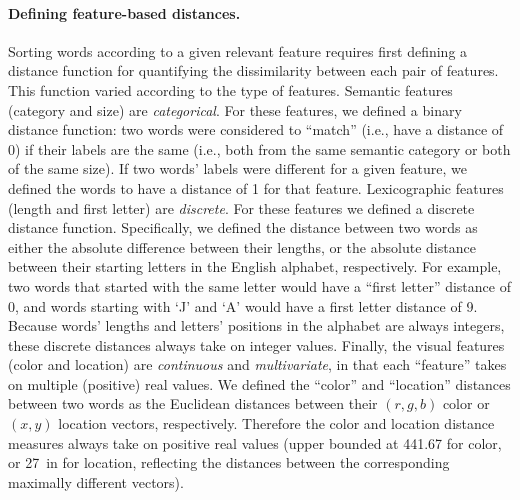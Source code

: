\documentclass[11pt]{article}
\begin{document}
\paragraph{Defining feature-based distances.} Sorting words according to a
given relevant feature requires first defining a distance function for
quantifying the dissimilarity between each pair of features. This function
varied according to the type of features. Semantic features (category and size)
are \textit{categorical}. For these features, we defined a binary distance
function: two words were considered to ``match'' (i.e., have a distance of 0)
if their labels are the same (i.e., both from the same semantic category or
both of the same size). If two words' labels were different for a given
feature, we defined the words to have a distance of 1 for that feature.
Lexicographic features (length and first letter) are \textit{discrete}. For
these features we defined a discrete distance function. Specifically, we
defined the distance between two words as either the absolute difference
between their lengths, or the absolute distance between their starting letters
in the English alphabet, respectively. For example, two words that started with
the same letter would have a ``first letter'' distance of 0, and words starting
with `J' and `A' would have a first letter distance of 9. Because words'
lengths and letters' positions in the alphabet are always integers, these
discrete distances always take on integer values. Finally, the visual features
(color and location) are \textit{continuous} and \textit{multivariate}, in that
each ``feature'' takes on multiple (positive) real values. We defined the
``color'' and ``location'' distances between two words as the Euclidean
distances between their $(r, g, b)$ color or $(x, y)$ location vectors,
respectively. Therefore the color and location distance measures always take on
positive real values (upper bounded at 441.67 for color, or 27~in for location,
reflecting the distances between the corresponding maximally different
vectors).
\end{document}

